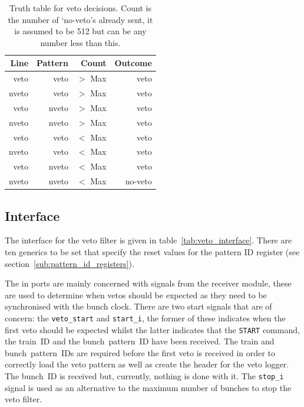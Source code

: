 \begin{table}[htbp]
  \begin{center}
    \begin{tabular}{r|r|r||r}
      Line  & Pattern &   Count   & Outcome \\
      \hline
      veto  &   veto  & \(>\) Max & veto    \\
      nveto &   veto  & \(>\) Max & veto    \\
      veto  &  nveto  & \(>\) Max & veto    \\
      nveto &  nveto  & \(>\) Max & veto    \\
      \hline
      veto  &   veto  & \(<\) Max & veto    \\
      nveto &   veto  & \(<\) Max & veto    \\
      veto  &  nveto  & \(<\) Max & veto    \\
      nveto &  nveto  & \(<\) Max & no-veto \\
            
    \end{tabular}
  \end{center}
  \caption{Truth table for veto decisions. Count is the number of `no-veto's already sent, it is assumed to be 512 but can be any number less than this.}
  \label{tab:veto_truth_table}
\end{table}

\subsection{Interface} %
\label{sub:veto_interface}
The interface for the veto filter is given in table~\ref{tab:veto_interface}. There are ten generics to be set that specify the reset values for the pattern ID register (see section~\ref{sub:pattern_id_registers}).
    
The in ports are mainly concerned with signals from the receiver module, these are used to determine when vetos should be expected as they need to be synchronised with the bunch clock. There are two start signals that are of concern: the \texttt{veto\_start} and \texttt{start\_i}, the former of these indicates when the first veto should be expected whilst the latter indicates that the \texttt{START} command, the train~ID and the bunch~pattern~ID have been received. The train and bunch~pattern~IDs are required before the first veto is received in order to correctly load the veto pattern as well as create the header for the veto logger. The bunch~ID is received but, currently, nothing is done with it. The \texttt{stop\_i} signal is used as an alternative to the maximum number of bunches to stop the veto filter.
    
